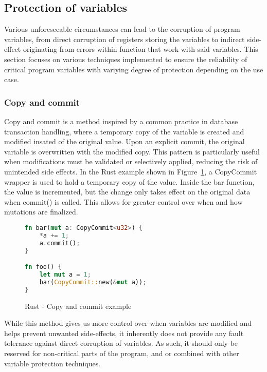\subsection{Protection of variables} \label{sec:var_protection}

Various unforeseeable circumstances can lead to the corruption of program variables, from direct corruption of registers storing the variables to indirect side-effect originating from errors within function that work with said variables. This section focuses on various techniques implemented to ensure the reliability of critical program variables with variying degree of protection depending on the use case.

\subsubsection{Copy and commit}

Copy and commit is a method inspired by a common practice in database transaction handling, where a temporary copy of the variable is created and modified insated of the original value. Upon an explicit commit, the original variable is overwritten with the modified copy. This pattern is particularly useful when modifications must be validated or selectively applied, reducing the risk of unintended side effects. In the Rust example shown in Figure~\ref{fig:rust_copy_commit}, a CopyCommit wrapper is used to hold a temporary copy of the value. Inside the bar function, the value is incremented, but the change only takes effect on the original data when commit() is called. This allows for greater control over when and how mutations are finalized.

\begin{figure}[!h]
\begin{lstlisting}[language=Rust]
fn bar(mut a: CopyCommit<u32>) {
    *a += 1;
    a.commit();
}

fn foo() {
    let mut a = 1;
    bar(CopyCommit::new(&mut a));
}
\end{lstlisting}
\caption{Rust - Copy and commit example}
\label{fig:rust_copy_commit}
\end{figure}

While this method gives us more control over when variables are modified and helps prevent unwanted side-effects, it inherently does not provide any fault tolerance against direct corruption of variables. As such, it should only be reserved for non-critical parts of the program, and or combined with other variable protection techniques.

